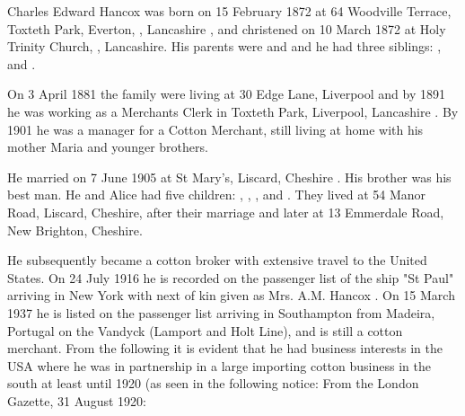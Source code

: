 
Charles Edward Hancox was born on 15 February 1872 at 64 Woodville Terrace, Toxteth Park, Everton, , Lancashire \cite{CEHancoxBirth},
and christened on 10 March 1872 at Holy Trinity Church, , Lancashire.\cite{CEHancoxBaptism}
His parents were  and  and he had three siblings:
,  and .

On 3 April 1881 the family were living at 30 Edge Lane, Liverpool \cite{CEHancoxResidence}
and by 1891 he was working as a Merchants Clerk in Toxteth Park, Liverpool, Lancashire \cite{CEHancoxOccupation1}.
By 1901 he was a manager for a Cotton Merchant, still living at home with his mother Maria and younger brothers.

He married  on 7 June 1905 at St Mary's, Liscard, Cheshire \cite{CEHancoxMarriage}.
His brother  was his best man.\cite{PeterKarpinski_2016-04-04}
He and Alice had five children: , , ,  and .
They lived at 54 Manor Road, Liscard, Cheshire, after their marriage\cite{CharlesEdwardHancoxHouse} and later at 13 Emmerdale Road, New Brighton, Cheshire. 

He subsequently became a cotton broker with extensive travel to the United States.  On 24 July 1916 he is recorded on the passenger list of the ship "St Paul" arriving in New York with next of kin given as Mrs. A.M. Hancox \cite{CEHancoxTravel}. On 15 March 1937 he is listed on the passenger list arriving in Southampton from Madeira, Portugal on the Vandyck (Lamport and Holt Line), and is still a cotton merchant. From the following it is evident that he had business interests in the USA where he was in partnership in a large importing cotton business in the south \cite{CEHancoxOccupation2} at least until 1920 (as seen in the following notice:
From the London Gazette, 31 August 1920:

